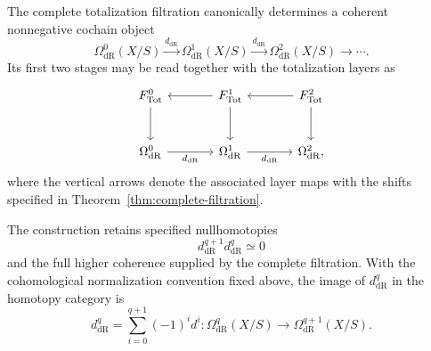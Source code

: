 \begin{theorem}
\label{thm:complete-filtrations-coherent-cochains}
The complete totalization filtration canonically determines a coherent nonnegative
cochain object
\[
  \Omega^0_{\mathrm{dR}}(X/S)
  \xrightarrow{d_{\mathrm{dR}}}
  \Omega^1_{\mathrm{dR}}(X/S)
  \xrightarrow{d_{\mathrm{dR}}}
  \Omega^2_{\mathrm{dR}}(X/S)
  \longrightarrow\cdots.
\]
Its first two stages may be read together with the totalization layers as
\[
\begin{tikzcd}[column sep=large,row sep=large]
  F^0_{\mathrm{Tot}} \arrow[d]
  & F^1_{\mathrm{Tot}} \arrow[l] \arrow[d]
  & F^2_{\mathrm{Tot}} \arrow[l] \arrow[d]
  \\
  \Omega^0_{\mathrm{dR}}
    \arrow[r,"d_{\mathrm{dR}}"']
  & \Omega^1_{\mathrm{dR}}
    \arrow[r,"d_{\mathrm{dR}}"']
  & \Omega^2_{\mathrm{dR}},
\end{tikzcd}
\]
where the vertical arrows denote the associated layer maps with the shifts
specified in Theorem~\ref{thm:complete-filtration}.

The construction retains specified nullhomotopies
\[
  d^{q+1}_{\mathrm{dR}}d^q_{\mathrm{dR}}\simeq0
\]
and the full higher coherence supplied by the complete filtration. With the
cohomological normalization convention fixed above, the image of
\(d^q_{\mathrm{dR}}\) in the homotopy category is
\[
  d^q_{\mathrm{dR}}
  =
  \sum_{i=0}^{q+1}(-1)^id^i
  :
  \Omega^q_{\mathrm{dR}}(X/S)
  \longrightarrow
  \Omega^{q+1}_{\mathrm{dR}}(X/S).
\]
\end{theorem}

